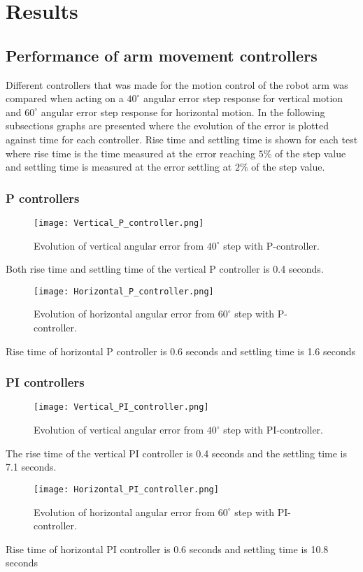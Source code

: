 \section{Results}

\subsection{Performance of arm movement controllers}
Different controllers that was made for the motion control of the robot arm was compared when acting on a \(40^{\circ}\) angular error step response for vertical motion and \(60^{\circ}\) angular error step response for horizontal motion. In the following subsections graphs are presented where the evolution of the error is plotted against time for each controller. Rise time and settling time is shown for each test where rise time is the time measured at the error reaching \(5\%\) of the step value and settling time is measured at the error settling at \(2\%\) of the step value.

\subsubsection{P controllers}
\begin{figure}[H]
\centering
\texttt{[image: Vertical\_P\_controller.png]}
\caption{Evolution of vertical angular error from \(40^{\circ}\) step with P-controller.}
\label{vert_P}
\end{figure}
Both rise time and settling time of the vertical P controller is 0.4 seconds.
\begin{figure}[H]
\centering
\texttt{[image: Horizontal\_P\_controller.png]}
\caption{Evolution of horizontal angular error from \(60^{\circ}\) step with P-controller.}
\label{vert_P}
\end{figure}
Rise time of horizontal P controller is 0.6 seconds and settling time is 1.6 seconds

\subsubsection{PI controllers}
\begin{figure}[H]
\centering
\texttt{[image: Vertical\_PI\_controller.png]}
\caption{Evolution of vertical angular error from \(40^{\circ}\) step with PI-controller.}
\label{vert_P}
\end{figure}
The rise time of the vertical PI controller is 0.4 seconds and the settling time is 7.1 seconds.
\begin{figure}[H]
\centering
\texttt{[image: Horizontal\_PI\_controller.png]}
\caption{Evolution of horizontal angular error from \(60^{\circ}\) step with PI-controller.}
\label{vert_P}
\end{figure}
Rise time of horizontal PI controller is 0.6 seconds and settling time is 10.8 seconds

